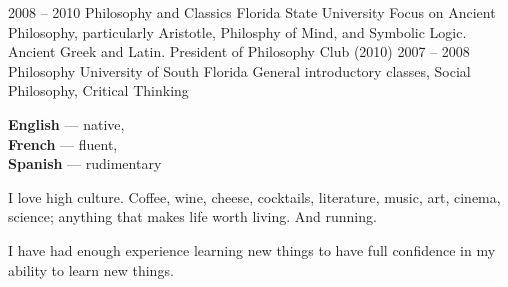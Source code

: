 \documentclass[9pt]{developercv} %
\begin{document}


\begin{entrylist}
    \entry
        {2008 -- 2010}
        {Philosophy and Classics}
        {Florida State University}
        {Focus on Ancient Philosophy, particularly Aristotle, Philosphy of Mind,
        and Symbolic Logic. Ancient Greek and Latin. President of Philosophy
        Club (2010)}
    \entry
        {2007 -- 2008}
        {Philosophy}
        {University of South Florida}
        {General introductory classes, Social Philosophy, Critical Thinking}
\end{entrylist}


\begin{minipage}[t]{0.2\textwidth}
    \vspace{-\baselineskip} %


        \textbf{English} — native,\\
        \textbf{French} — fluent,\\
        \textbf{Spanish} — rudimentary

\end{minipage}
\hfill
\begin{minipage}[t]{0.3\textwidth}
    \vspace{-\baselineskip} %


    I love high culture. Coffee, wine, cheese, cocktails, literature, music,
    art, cinema, science; anything that makes life worth living. And running.
\end{minipage}
\hfill
\begin{minipage}[t]{0.35\textwidth}
    \vspace{-\baselineskip} %


    I have had enough experience learning new things to have full confidence in
    my ability to learn new things.
\end{minipage}

\end{document}

